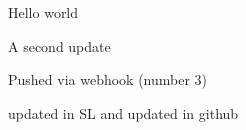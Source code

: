 \documentclass{article}
\begin{document}
Hello world

A second update

Pushed via webhook (number 3)

updated in SL and updated in github
\end{document}
